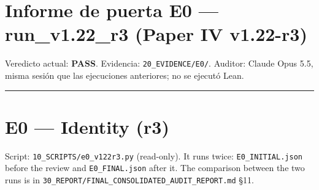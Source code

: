 \documentclass[
]{article}
\author{}
\date{}
\begin{document}
\section{Informe de puerta E0 --- run\_v1.22\_r3 (Paper IV
v1.22-r3)}\label{informe-de-puerta-e0--run_v122_r3-paper-iv-v122-r3}

Veredicto actual: \textbf{PASS}. Evidencia: \texttt{20\_EVIDENCE/E0/}.
Auditor: Claude Opus 5.5, misma sesión que las ejecuciones anteriores;
no se ejecutó Lean.

\begin{center}\rule{0.5\linewidth}{0.5pt}\end{center}

\section{E0 --- Identity (r3)}\label{e0--identity-r3}

Script: \texttt{10\_SCRIPTS/e0\_v122r3.py} (read-only). It runs twice:
\texttt{E0\_INITIAL.json} before the review and \texttt{E0\_FINAL.json}
after it. The comparison between the two runs is in
\texttt{30\_REPORT/FINAL\_CONSOLIDATED\_AUDIT\_REPORT.md} §11.
\end{document}
